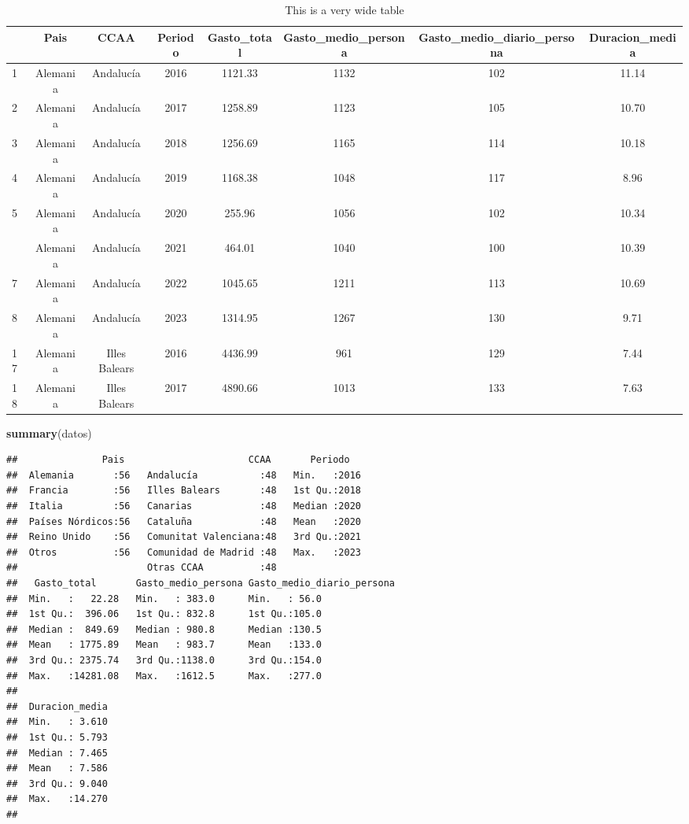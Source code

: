 \documentclass[data,article,submit,moreauthors,pdftex]{Definitions/mdpi}
\newenvironment{Shaded}{\begin{snugshade}}{\end{snugshade}}
\newcommand{\FunctionTok}[1]{\textcolor[rgb]{0.13,0.29,0.53}{\textbf{#1}}}
\newcommand{\NormalTok}[1]{#1}
\begin{document}
\begin{table}[H]

\caption{\label{tab:tab2}This is a very wide table}
\begin{tabular}[t]{lccccccc}
\toprule
  & Pais & CCAA & Periodo & Gasto\_total & Gasto\_medio\_persona & Gasto\_medio\_diario\_persona & Duracion\_media\\
\midrule
1 & Alemania & Andalucía & 2016 & 1121.33 & 1132 & 102 & 11.14\\
2 & Alemania & Andalucía & 2017 & 1258.89 & 1123 & 105 & 10.70\\
3 & Alemania & Andalucía & 2018 & 1256.69 & 1165 & 114 & 10.18\\
4 & Alemania & Andalucía & 2019 & 1168.38 & 1048 & 117 & 8.96\\
5 & Alemania & Andalucía & 2020 & 255.96 & 1056 & 102 & 10.34\\
\addlinespace
6 & Alemania & Andalucía & 2021 & 464.01 & 1040 & 100 & 10.39\\
7 & Alemania & Andalucía & 2022 & 1045.65 & 1211 & 113 & 10.69\\
8 & Alemania & Andalucía & 2023 & 1314.95 & 1267 & 130 & 9.71\\
17 & Alemania & Illes Balears & 2016 & 4436.99 & 961 & 129 & 7.44\\
18 & Alemania & Illes Balears & 2017 & 4890.66 & 1013 & 133 & 7.63\\
\bottomrule
\end{tabular}
\end{table}

\begin{Shaded}
\begin{Highlighting}[]
\FunctionTok{summary}\NormalTok{(datos)}
\end{Highlighting}
\end{Shaded}

\begin{verbatim}
##               Pais                      CCAA       Periodo    
##  Alemania       :56   Andalucía           :48   Min.   :2016  
##  Francia        :56   Illes Balears       :48   1st Qu.:2018  
##  Italia         :56   Canarias            :48   Median :2020  
##  Países Nórdicos:56   Cataluña            :48   Mean   :2020  
##  Reino Unido    :56   Comunitat Valenciana:48   3rd Qu.:2021  
##  Otros          :56   Comunidad de Madrid :48   Max.   :2023  
##                       Otras CCAA          :48                 
##   Gasto_total       Gasto_medio_persona Gasto_medio_diario_persona
##  Min.   :   22.28   Min.   : 383.0      Min.   : 56.0             
##  1st Qu.:  396.06   1st Qu.: 832.8      1st Qu.:105.0             
##  Median :  849.69   Median : 980.8      Median :130.5             
##  Mean   : 1775.89   Mean   : 983.7      Mean   :133.0             
##  3rd Qu.: 2375.74   3rd Qu.:1138.0      3rd Qu.:154.0             
##  Max.   :14281.08   Max.   :1612.5      Max.   :277.0             
##                                                                   
##  Duracion_media  
##  Min.   : 3.610  
##  1st Qu.: 5.793  
##  Median : 7.465  
##  Mean   : 7.586  
##  3rd Qu.: 9.040  
##  Max.   :14.270  
## 
\end{verbatim}
\end{document}
